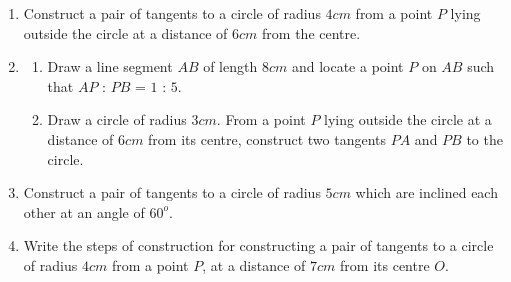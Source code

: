 \begin{enumerate}[label=\thesection.\arabic*.,ref=\thesection.\theenumi]
\begin{enumerate}[label=\arabic*.,ref=\theenumi]
     \item Construct a pair of tangents to a circle of radius $4cm$ from a point $P$ lying outside the circle at a distance of $6cm$ from the centre.

     \item     

     \begin{enumerate}[label=(\alph*)]

     \item Draw a line segment $AB$ of length $8cm$ and locate a point $P$ 
      on $AB$ such that $AP$ : $PB$ = $1$ : $5$.

      \item  Draw a circle of radius $3 cm$. From a point $P$ lying outside the 
       circle at a distance of $6cm$ from its centre, construct two tangents
       $PA$ and $PB$ to the circle.

       \end{enumerate}

       \item Construct a pair of tangents to a circle of radius $5cm$ which are inclined each other at an angle of $60^{o}$.


        \item Write the steps of construction for constructing a pair of
         tangents to a circle of radius $4cm$ from a point $P$, at a distance
         of $7cm$ from its centre $O$.
\end{enumerate}
\end{enumerate}
	

